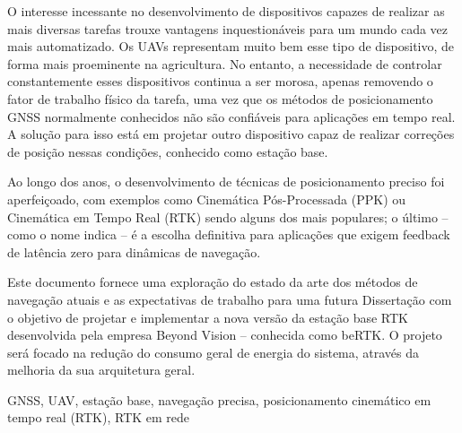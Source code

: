 O interesse incessante no desenvolvimento de dispositivos capazes de realizar as mais diversas tarefas trouxe vantagens inquestionáveis para um mundo cada vez mais automatizado. Os UAVs representam muito bem esse tipo de dispositivo, de forma mais proeminente na agricultura. No entanto, a necessidade de controlar constantemente esses dispositivos continua a ser morosa, apenas removendo o fator de trabalho físico da tarefa, uma vez que os métodos de posicionamento GNSS normalmente conhecidos não são confiáveis para aplicações em tempo real. A solução para isso está em projetar outro dispositivo capaz de realizar correções de posição nessas condições, conhecido como estação base.

Ao longo dos anos, o desenvolvimento de técnicas de posicionamento preciso foi aperfeiçoado, com exemplos como Cinemática Pós-Processada (PPK) ou Cinemática em Tempo Real (RTK) sendo alguns dos mais populares; o último -- como o nome indica -- é a escolha definitiva para aplicações que exigem feedback de latência zero para dinâmicas de navegação.

Este documento fornece uma exploração do estado da arte dos métodos de navegação atuais e as expectativas de trabalho para uma futura Dissertação com o objetivo de projetar e implementar a nova versão da estação base RTK desenvolvida pela empresa Beyond Vision -- conhecida como beRTK\textsuperscript{\textregistered}. O projeto será focado na redução do consumo geral de energia do sistema, através da melhoria da sua arquitetura geral.

\begin{keywords}
    GNSS, UAV, estação base, navegação precisa, posicionamento cinemático em tempo real (RTK), RTK em rede
\end{keywords}
